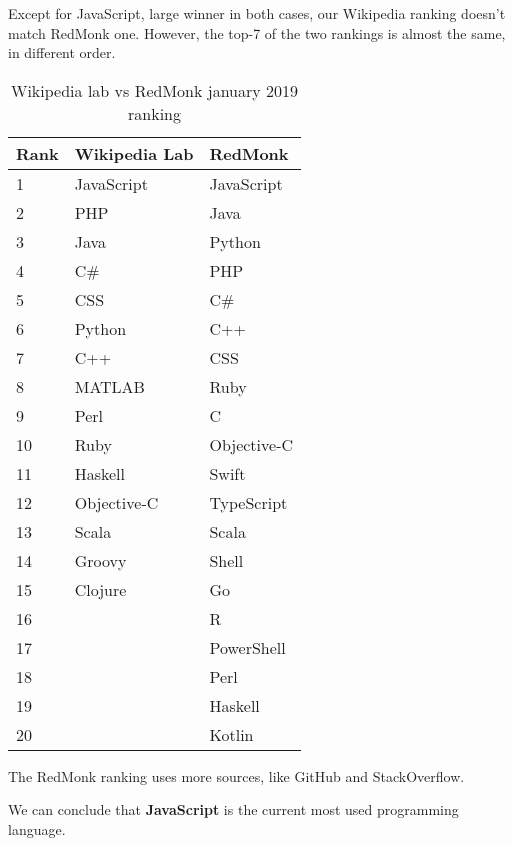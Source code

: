 \documentclass[a4paper]{article}
\begin{document}
	Except for JavaScript, large winner in both cases, our Wikipedia ranking doesn't match RedMonk one.
	However, the top-7 of the two rankings is almost the same, in different order.

	\begin{table}[H]
		\centering
		\begin{tabular}{|l|l|l|}
			\hline
			\textbf{Rank}  & \textbf{Wikipedia Lab}  & \textbf{RedMonk} \\ \hline
			\hline
			1              & JavaScript              & JavaScript       \\ \hline
			2              & PHP                     & Java             \\ \hline
			3              & Java                    & Python           \\ \hline
			4              & C\#                     & PHP              \\ \hline
			5              & CSS                     & C\#              \\ \hline
			6              & Python                  & C++              \\ \hline
			7              & C++                     & CSS              \\ \hline
			\hline
			8              & MATLAB                  & Ruby             \\ \hline
			9              & Perl                    & C                \\ \hline
			10             & Ruby                    & Objective-C      \\ \hline
			11             & Haskell                 & Swift            \\ \hline
			12             & Objective-C             & TypeScript       \\ \hline
			13             & Scala                   & Scala            \\ \hline
			14             & Groovy                  & Shell            \\ \hline
			15             & Clojure                 & Go               \\ \hline
			16             &                         & R                \\ \hline
			17             &                         & PowerShell       \\ \hline
			18             &                         & Perl             \\ \hline
			19             &                         & Haskell          \\ \hline
			20             &                         & Kotlin           \\ \hline
		\end{tabular}
		\caption{Wikipedia lab vs RedMonk january 2019 ranking}
	\end{table}
	
	The RedMonk ranking uses more sources, like GitHub and StackOverflow.

	We can conclude that \textbf{JavaScript} is the current most used programming language.
\end{document}
